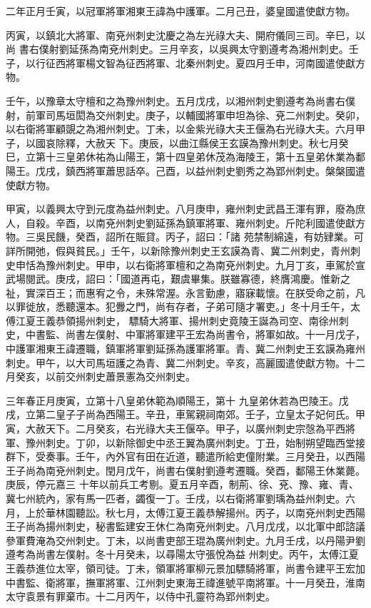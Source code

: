 \begin{pinyinscope}
 二年正月壬寅，以冠軍將軍湘東王諱為中護軍。二月己丑，婆皇國遣使獻方物。



 丙寅，以鎮北大將軍、南兗州刺史沈慶之為左光祿大夫、開府儀同三司。辛巳，以尚
 書右僕射劉延孫為南兗州刺史。三月辛亥，以吳興太守劉遵考為湘州刺史。壬子，以行征西將軍楊文智為征西將軍、北秦州刺史。夏四月壬申，河南國遣使獻方物。



 壬午，以豫章太守檀和之為豫州刺史。五月戊戌，以湘州刺史劉遵考為尚書右僕射，前軍司馬垣閎為交州刺史。庚子，以輔國將軍申坦為徐、兗二州刺史。癸卯，以右衛將軍顧覬之為湘州刺史。丁未，以金紫光祿大夫王偃為右光祿大夫。六月甲子，以國哀除釋，大赦天
 下。庚辰，以曲江縣侯王玄謨為豫州刺史。秋七月癸巳，立第十三皇弟休祐為山陽王，第十四皇弟休茂為海陵王，第十五皇弟休業為鄱陽王。戊戌，鎮西將軍蕭思話卒。己酉，以益州刺史劉秀之為郢州刺史。槃槃國遣使獻方物。



 甲寅，以義興太守到元度為益州刺史。八月庚申，雍州刺史武昌王渾有罪，廢為庶人，自殺。辛酉，以南兗州刺史劉延孫為鎮軍將軍、雍州刺史。斤陀利國遣使獻方物。三吳民饑，癸酉，詔所在賑貸。丙子，詔曰：「諸
 苑禁制綿遠，有妨肄業。可詳所開弛，假與貧民。」壬午，以新除豫州刺史王玄謨為青、冀二州刺史，青州刺史申恬為豫州刺史。甲申，以右衛將軍檀和之為南兗州刺史。九月丁亥，車駕於宣武場閱武。庚戌，詔曰：「國道再屯，艱虞畢集。朕雖寡德，終膺鴻慶。惟新之祉，實深百王；而惠宥之令，未殊常渥。永言勤慮，寤寐載懷。在朕受命之前，凡以罪徙放，悉聽還本。犯釁之門，尚有存者，子弟可隨才署吏。」冬十月壬午，太傅江夏王義恭領揚州刺史，
 驃騎大將軍、揚州刺史竟陵王誕為司空、南徐州刺史，中書監、尚書左僕射、中軍將軍建平王宏為尚書令，將軍如故。十一月戊子，中護軍湘東王諱遷職，鎮軍將軍劉延孫為護軍將軍。青、冀二州刺史王玄謨為雍州刺史。甲午，以大司馬垣護之為青、冀二州刺史。辛亥，高麗國遣使獻方物。十二月癸亥，以前交州刺史蕭景憲為交州刺史。



 三年春正月庚寅，立第十八皇弟休範為順陽王，第十
 九皇弟休若為巴陵王。戊戌，立第二皇子子尚為西陽王。辛丑，車駕親祠南郊。壬子，立皇太子妃何氏。甲寅，大赦天下。二月癸亥，右光祿大夫王偃卒。甲子，以廣州刺史宗愨為平西將軍、豫州刺史。丁卯，以新除御史中丞王翼為廣州刺史。丁丑，始制朔望臨西堂接群下，受奏事。壬午，內外官有田在近道，聽遣所給吏僮附業。三月癸丑，以西陽王子尚為南兗州刺史。閏月戊午，尚書右僕射劉遵考遷職。癸酉，鄱陽王休業薨。庚辰，停元嘉三
 十年以前兵工考剔。夏五月辛酉，制荊、徐、兗、豫、雍、青、冀七州統內，家有馬一匹者，蠲復一丁。壬戌，以右衛將軍劉瑀為益州刺史。六月，上於華林園聽訟。秋七月，太傅江夏王義恭解揚州。丙子，以南兗州刺史西陽王子尚為揚州刺史，秘書監建安王休仁為南兗州刺史。八月戊戌，以北軍中郎諮議參軍費淹為交州刺史。丁未，以尚書吏部王琨為廣州刺史。九月壬戌，以丹陽尹劉遵考為尚書左僕射。冬十月癸未，以尋陽太守張悅為益
 州刺史。丙午，太傅江夏王義恭進位太宰，領司徒。丁未，領軍將軍柳元景加驃騎將軍，尚書令建平王宏加中書監、衛將軍，撫軍將軍、江州刺史東海王禕進號平南將軍。十一月癸丑，淮南太守袁景有罪棄市。十二月丙午，以侍中孔靈符為郢州刺史。




\end{pinyinscope}
